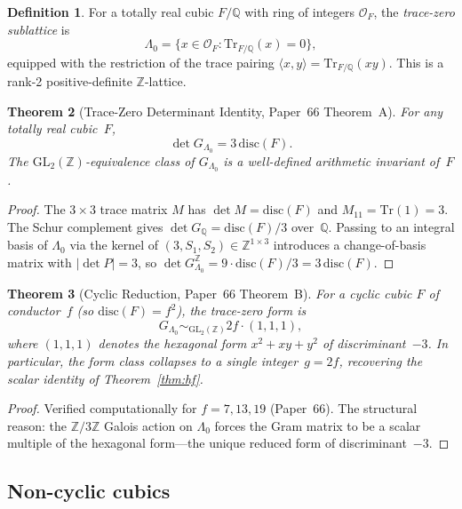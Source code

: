 \documentclass[11pt]{article}
\theoremstyle{plain}
\newtheorem{theorem}{Theorem}[section]
\theoremstyle{definition}
\newtheorem{definition}[theorem]{Definition}
\theoremstyle{remark}
\newcommand{\Z}{\mathbb{Z}}
\newcommand{\Q}{\mathbb{Q}}
\newcommand{\calO}{\mathcal{O}}
\newcommand{\Tr}{\mathrm{Tr}}
\newcommand{\disc}{\mathrm{disc}}
\newcommand{\GL}{\mathrm{GL}}
\begin{document}
\begin{definition}\label{def:tracezero}
For a totally real cubic $F/\Q$ with ring of integers $\calO_F$,
the \emph{trace-zero sublattice} is
\[
  \Lambda_0 = \{x \in \calO_F : \Tr_{F/\Q}(x) = 0\},
\]
equipped with the restriction of the trace pairing
$\langle x, y \rangle = \Tr_{F/\Q}(xy)$.  This is a rank-2
positive-definite $\Z$-lattice.
\end{definition}

\begin{theorem}[Trace-Zero Determinant Identity,
  Paper~66 Theorem~A]\label{thm:tracezero}
For any totally real cubic~$F$,
\[
  \det G_{\Lambda_0} = 3 \, \disc(F).
\]
The $\GL_2(\Z)$-equivalence class of $G_{\Lambda_0}$ is a
well-defined arithmetic invariant of~$F$.
\end{theorem}

\begin{proof}
The $3 \times 3$ trace matrix $M$ has $\det M = \disc(F)$ and
$M_{11} = \Tr(1) = 3$.  The Schur complement gives
$\det G_\Q = \disc(F) / 3$ over~$\Q$.  Passing to an integral
basis of $\Lambda_0$ via the kernel of $(3, S_1, S_2) \in
\Z^{1 \times 3}$ introduces a change-of-basis matrix with
$|\det P| = 3$, so
$\det G_{\Lambda_0}^\Z = 9 \cdot \disc(F)/3 = 3\,\disc(F)$.
\end{proof}

\begin{theorem}[Cyclic Reduction,
  Paper~66 Theorem~B]\label{thm:cyclic}
For a cyclic cubic $F$ of conductor~$f$ (so
$\disc(F) = f^2$), the trace-zero form is
\[
  G_{\Lambda_0} \sim_{\GL_2(\Z)} 2f \cdot (1, 1, 1),
\]
where $(1, 1, 1)$ denotes the hexagonal form $x^2 + xy + y^2$
of discriminant~$-3$.  In particular, the form class collapses
to a single integer~$g = 2f$, recovering the scalar identity
of Theorem~\ref{thm:hf}.
\end{theorem}

\begin{proof}
Verified computationally for $f = 7, 13, 19$ (Paper~66).  The
structural reason: the $\Z/3\Z$ Galois action on $\Lambda_0$
forces the Gram matrix to be a scalar multiple of the hexagonal
form---the unique reduced form of discriminant~$-3$.
\end{proof}


\subsection{Non-cyclic cubics}
\end{document}

